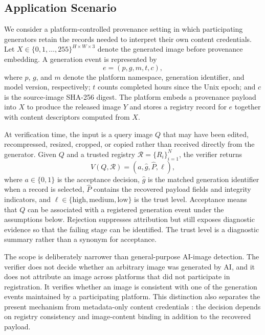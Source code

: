 \documentclass[a4paper,fleqn]{cas-sc}
\begin{document}
\subsection{Application Scenario}
We consider a platform-controlled provenance setting in which participating
generators retain the records needed to interpret their own content
credentials. Let $X\in\{0,1,\ldots,255\}^{H\times W\times3}$ denote the
generated image before provenance embedding. A generation event is represented
by
\begin{equation}
  e=(p,g,m,t,c),
  \label{eq:generation-event}
\end{equation}
where $p$, $g$, and $m$ denote the platform namespace, generation identifier,
and model version, respectively; $t$ counts completed hours since the Unix
epoch; and $c$ is the source-image SHA-256 digest. The platform embeds a
provenance payload into $X$ to produce the released image $Y$ and stores a
registry record for $e$ together with content descriptors computed from $X$.

At verification time, the input is a query image $Q$ that may have been
edited, recompressed, resized, cropped, or copied rather than received directly
from the generator. Given $Q$ and a trusted registry
$\mathcal{R}=\{R_i\}_{i=1}^{N}$, the verifier returns
\begin{equation}
  V(Q,\mathcal{R})=(a,\hat{g},\hat{P},\ell),
  \label{eq:verification-output}
\end{equation}
where $a\in\{0,1\}$ is the acceptance decision, $\hat{g}$ is the matched
generation identifier when a record is selected, $\hat{P}$ contains the
recovered payload fields and integrity indicators, and
$\ell\in\{\text{high},\text{medium},\text{low}\}$ is the trust level.
Acceptance means that $Q$ can be associated with a registered generation event
under the assumptions below. Rejection suppresses attribution but still
exposes diagnostic evidence so that the failing stage can be identified. The
trust level is a diagnostic summary rather than a synonym for acceptance.

The scope is deliberately narrower than general-purpose AI-image detection.
The verifier does not decide whether an arbitrary image was generated by AI,
and it does not attribute an image across platforms that did not participate
in registration. It verifies whether an image is consistent with one of the
generation events maintained by a participating platform. This distinction
also separates the present mechanism from metadata-only content credentials
\cite{noauthor_content_nodate,collomosse_authenticity_2024}: the decision
depends on registry consistency and image-content binding in addition to the
recovered payload.
\end{document}
